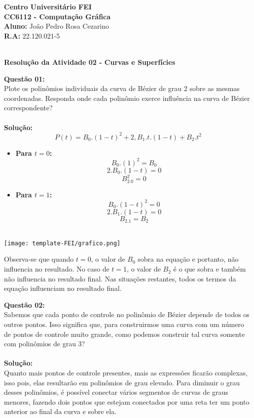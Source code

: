 \documentclass[a4paper, 12pt]{article}
\begin{document}
\noindent \textbf{Centro Universitário FEI}\\
\noindent \textbf{CC6112 - Computação Gráfica}\\
\noindent \textbf{Aluno: } João Pedro Rosa Cezarino  \\ 
\noindent \textbf{R.A: } 22.120.021-5\\
\\
\begin{center}
    \noindent \textbf{Resolução da Atividade 02 - Curvas e Superfícies}
\end{center}
\vspace{0.5cm}
\noindent\textbf{Questão 01:}\\
Plote os polinômios individuais da curva de Bézier de grau 2 sobre as mesmas coordenadas.
Responda onde cada polinômio exerce influência na curva de Bézier correspondente?\\
\\
\noindent\textbf{Solução:}
\\
$$P(t) = B_0.(1-t)^2 + 2,B_1 . t . (1-t) + B_2 . t^2$$
\begin{itemize}
\item\textbf{Para $t=0$:}
    \\
		$$B_0.(1)^2=B_0$$
		$$2.B_0.(1-t)=0$$
		$$B_2.0^2=0$$
\item\textbf{Para $t=1$:}
	\\
		$$B_0.(1-t)^2=0$$
		$$2.B_1.(1-t)=0$$
		$$B_2.1=B_2$$
	\\
\end{itemize}
\begin{minipage}[c]{0.5\linewidth} 
\texttt{[image: template-FEI/grafico.png]}
\end{minipage}\hfill
\begin{minipage}[c]{0.4\linewidth} 
Observa-se que quando $t=0$, o valor de $B_0$ sobra na equação e portanto, não influencia no resultado. No caso de $t=1$, o valor de $B_2$ é o que sobra e também não influencia no resultado final. Nas situações restantes, todos os termos da equação influenciam no resultado final.
\end{minipage}

\vspace{1 cm}
\noindent\textbf{Questão 02:} \\
Sabemos que cada ponto de controle no polinômio de Bézier depende de todos os outros pontos.
Isso significa que, para construirmos uma curva com um número de pontos de controle muito
grande, como podemos construir tal curva somente com polinômios de grau 3?\\
\\
\noindent\textbf{Solução:}\\
Quanto mais pontos de controle presentes, mais as expressões ficarão complexas, isso pois, elas resultarão 
em polinômios de grau elevado. Para diminuir o grau desses polinômios, é possível conectar 
vários segmentos de curvas de graus menores, fazendo dois pontos que estejam conectados
por uma reta ter um ponto anterior ao final da curva e sobre ela.
\end{document}
